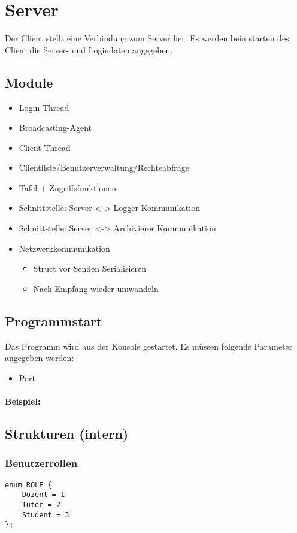 \section{Server}
Der Client stellt eine Verbindung zum Server her. Es werden bein starten des Client die Server- und Logindaten angegeben.

\subsection{Module}
\begin{itemize}
	\item Login-Thread
	\item Broadcasting-Agent
	\item Client-Thread
	\item Clientliste/Benutzerverwaltung/Rechteabfrage
	\item Tafel + Zugriffsfunktionen
	\item Schnittstelle: Server <-> Logger Kommunikation
	\item Schnittstelle: Server <-> Archivierer Kommunikation
	\item Netzwerkkommunikation
	\begin{itemize}
		\item Struct vor Senden Serialisieren
		\item Nach Empfang wieder umwandeln
	\end{itemize}
\end{itemize}

\subsection{Programmstart}
Das Programm wird aus der Konsole gestartet. Es müssen folgende Parameter angegeben werden:
\begin{itemize}
	\item Port
\end{itemize}

\paragraph{Beispiel:}

\subsection{Strukturen (intern)}
\subsubsection{Benutzerrollen}
\begin{lstlisting}
enum ROLE {
    Dozent = 1
    Tutor = 2
    Student = 3
};
\end{lstlisting}


